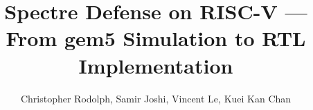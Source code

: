 \documentclass[sigplan,screen,10pt]{acmart}
\begin{document}
\title{Spectre Defense on RISC-V — From gem5 Simulation to RTL Implementation}

\author{Christopher Rodolph, Samir Joshi, Vincent Le, Kuei Kan Chan}



\maketitle





% 

% 



\end{document}
